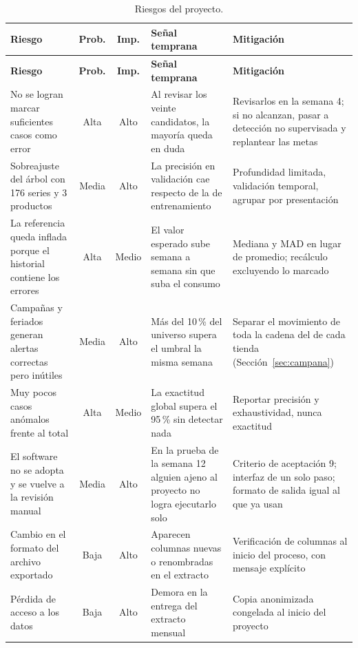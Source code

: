 \begin{longtable}{@{}L{3.3cm}ccL{3.6cm}L{4.4cm}@{}}
\caption{Riesgos del proyecto.}\label{tab:riesgos}\\
\toprule
\textbf{Riesgo} & \textbf{Prob.} & \textbf{Imp.} & \textbf{Señal temprana} & \textbf{Mitigación} \\
\midrule
\endfirsthead
\toprule
\textbf{Riesgo} & \textbf{Prob.} & \textbf{Imp.} & \textbf{Señal temprana} & \textbf{Mitigación} \\
\midrule
\endhead
\small No se logran marcar suficientes casos como error & \small Alta & \small Alto & \small Al revisar los veinte candidatos, la mayoría queda en duda & \small Revisarlos en la semana 4; si no alcanzan, pasar a detección no supervisada y replantear las metas \\
\small Sobreajuste del árbol con 176 series y 3 productos & \small Media & \small Alto & \small La precisión en validación cae respecto de la de entrenamiento & \small Profundidad limitada, validación temporal, agrupar por presentación \\
\small La referencia queda inflada porque el historial contiene los errores & \small Alta & \small Medio & \small El valor esperado sube semana a semana sin que suba el consumo & \small Mediana y MAD en lugar de promedio; recálculo excluyendo lo marcado \\
\small Campañas y feriados generan alertas correctas pero inútiles & \small Media & \small Alto & \small Más del 10\,\% del universo supera el umbral la misma semana & \small Separar el movimiento de toda la cadena del de cada tienda (Sección~\ref{sec:campana}) \\
\small Muy pocos casos anómalos frente al total & \small Alta & \small Medio & \small La exactitud global supera el 95\,\% sin detectar nada & \small Reportar precisión y exhaustividad, nunca exactitud \\
\small El software no se adopta y se vuelve a la revisión manual & \small Media & \small Alto & \small En la prueba de la semana 12 alguien ajeno al proyecto no logra ejecutarlo solo & \small Criterio de aceptación 9; interfaz de un solo paso; formato de salida igual al que ya usan \\
\small Cambio en el formato del archivo exportado & \small Baja & \small Alto & \small Aparecen columnas nuevas o renombradas en el extracto & \small Verificación de columnas al inicio del proceso, con mensaje explícito \\
\small Pérdida de acceso a los datos & \small Baja & \small Alto & \small Demora en la entrega del extracto mensual & \small Copia anonimizada congelada al inicio del proyecto \\
\bottomrule
\end{longtable}


